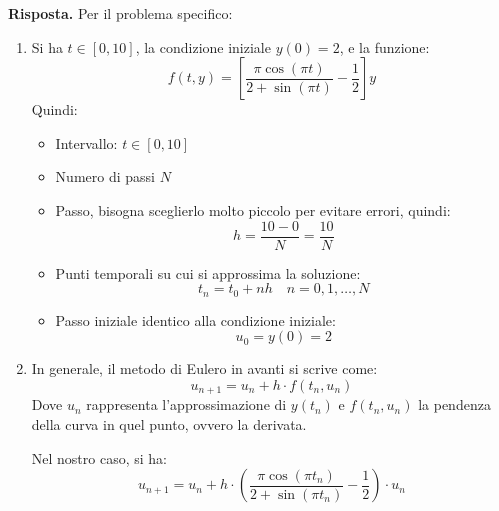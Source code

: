 \begin{itemize}
    \highspace
    \textbf{Risposta.} Per il problema specifico:
    \begin{enumerate}
        \item Si ha $t \in \left[0, 10\right]$, la condizione iniziale $y(0) = 2$, e la funzione:
        \begin{equation*}
            f(t, y) = \left[\dfrac{\pi \cos\left(\pi t\right)}{2 + \sin\left(\pi t\right)} - \dfrac{1}{2}\right] y
        \end{equation*}
        Quindi:
        \begin{itemize}
            \item Intervallo: $t \in \left[0, 10\right]$
            \item Numero di passi $N$
            \item Passo, bisogna sceglierlo molto piccolo per evitare errori, quindi:
            \begin{equation*}
                h = \dfrac{10 - 0}{N} = \dfrac{10}{N}
            \end{equation*}
            \item Punti temporali su cui si approssima la soluzione:
            \begin{equation*}
                t_n = t_0 + n h \quad n = 0, 1, \dots, N
            \end{equation*}
            \item Passo iniziale identico alla condizione iniziale:
            \begin{equation*}
                u_0 = y(0) = 2
            \end{equation*}
        \end{itemize}

        \item In generale, il metodo di Eulero in avanti si scrive come:
        \begin{equation*}
            u_{n+1} = u_{n} + h \cdot f(t_{n}, u_{n})
        \end{equation*}
        Dove $u_{n}$ rappresenta l'approssimazione di $y(t_{n})$ e $f(t_{n}, u_{n})$ \eaccent la pendenza della curva in quel punto, ovvero la derivata.

        Nel nostro caso, si ha:
        \begin{equation*}
            u_{n+1} = u_{n} + h \cdot \left(
                \dfrac{\pi \cos\left(\pi t_{n}\right)}{2 + \sin\left(\pi t_{n}\right)} - \dfrac{1}{2}
            \right) \cdot u_{n}
        \end{equation*}


\end{enumerate}
\end{itemize}
